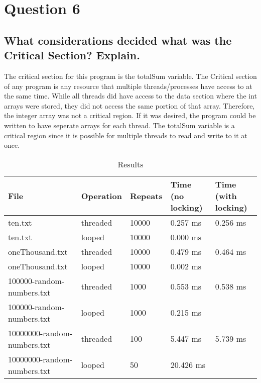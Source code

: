 \documentclass{assignment-x}
\begin{document}
\section{Question 6}
\subsection{What considerations decided what was the Critical Section? Explain.}
The critical section for this program is the totalSum variable. The Critical section of any program is any resource that multiple threads/processes have access to at the same time. While all threads did have access to the data section where the int arrays were stored, they did not access the same portion of that array. Therefore, the integer array was not a critical region. If it was desired, the program could be written to have seperate arrays for each thread. The totalSum variable is a critical region since it is possible for multiple threads to read and write to it at once.

\pagebreak

\begin{table}[htbp]
    \centering
    \begin{tabular}{|l|l|l|l|l|}
        \hline
        \textbf{File} & \textbf{Operation} & \textbf{Repeats} & \textbf{Time (no locking)} & \textbf{Time (with locking)} \\
        \hline
        ten.txt & threaded & 10000 & 0.257 ms & 0.256 ms \\
        ten.txt & looped & 10000 & 0.000 ms & \\
        oneThousand.txt & threaded & 10000 & 0.479 ms & 0.464 ms \\
        oneThousand.txt & looped & 10000 & 0.002 ms & \\
        100000-random-numbers.txt & threaded & 1000 & 0.553 ms & 0.538 ms \\
        100000-random-numbers.txt & looped & 1000 & 0.215 ms & \\
        10000000-random-numbers.txt & threaded & 100 & 5.447 ms & 5.739 ms \\
        10000000-random-numbers.txt & looped & 50 & 20.426 ms & \\
        \hline
    \end{tabular}
    \caption{Results}
    \label{tab:my_table}
\end{table}
\end{document}
